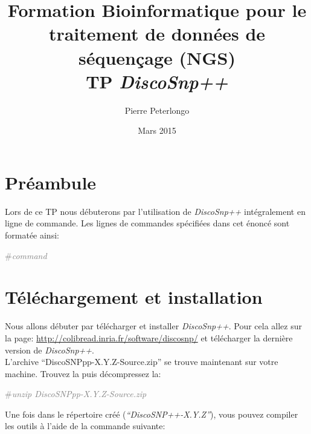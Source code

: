 
\usepackage{array}
\usepackage{url}
\usepackage{moreverb}
\usepackage{verbatim}
\usepackage[utf8]{inputenc}
\usepackage[T1]{fontenc}
\usepackage{xcolor}
\usepackage{xspace}
\newcommand{\discopp}{{\it DiscoSnp++}\xspace}
\newcommand{\code}[1]{\begin{center} \textcolor{gray}{\#{\emph{#1}}} \end{center}} 
\newcommand{\sligne}{\begin{center} \begin{tabular}{c}~~~~~~~~~~~~~~~~~~~~~~~~~~~~~~~~~~~~~~\\ \hline\\\end{tabular}\end{center}}


\title{Formation Bioinformatique pour le traitement de données de séquençage (NGS)\\
TP \discopp}
\date{Mars 2015} 
\author{Pierre Peterlongo}
\maketitle
\textbf{}

\section*{Préambule} %
\label{sec:preambule}
Lors de ce TP nous débuterons par l'utilisation de \discopp intégralement en ligne de commande. Les lignes de commandes spécifiées dans cet énoncé sont formatée ainsi:
\code{command}

\section{Téléchargement et installation} %
\label{sec:telechargement_et_installation}
Nous allons débuter par télécharger et installer \discopp. Pour cela allez sur la page: \url{http://colibread.inria.fr/software/discosnp/} et télécharger la dernière version de \discopp. \\

L'archive ``DiscoSNPpp-X.Y.Z-Source.zip'' se trouve maintenant sur votre machine. Trouvez la puis décompressez la:


\code{unzip DiscoSNPpp-X.Y.Z-Source.zip}

Une fois dans le répertoire créé (\emph{``DiscoSNP++-X.Y.Z''}), vous pouvez compiler les outils à l'aide de la commande suivante:

